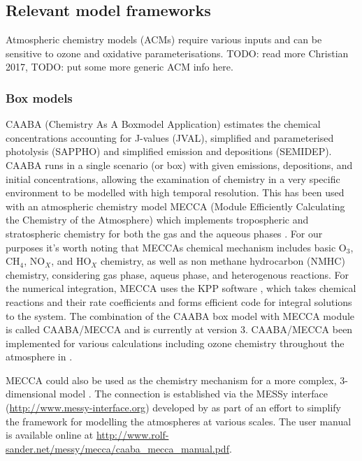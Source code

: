   \subsection{Relevant model frameworks}
  \label{LR:Models:frames}
    
    Atmospheric chemistry models (ACMs) require various inputs and can be sensitive to ozone and oxidative parameterisations. 
    TODO: read more Christian 2017,
    TODO: put some more generic ACM info here.
    
    \subsubsection{Box models} %
      
      CAABA (Chemistry As A Boxmodel Application) estimates the chemical concentrations accounting for J-values (JVAL), simplified and parameterised photolysis (SAPPHO) and simplified emission and depositions (SEMIDEP).
      CAABA runs in a single scenario (or box) with given emissions, depositions, and initial concentrations, allowing the examination of chemistry in a very specific environment to be modelled with high temporal resolution.
      This has been used with an atmospheric chemistry model MECCA (Module Efficiently Calculating the Chemistry of the Atmosphere) which implements tropospheric and stratospheric chemistry for both the gas and the aqueous phases \citep{Sander2005}.
      For our purposes it's worth noting that MECCAs chemical mechanism includes basic O$_3$, CH$_4$, NO$_X$, and HO$_X$ chemistry, as well as non methane hydrocarbon (NMHC) chemistry, considering gas phase, aqueus phase, and heterogenous reactions. \citep{Sander2005}
      For the numerical integration, MECCA uses the KPP software \citep{SanduSander2006}, which takes chemical reactions and their rate coefficients and forms efficient code for integral solutions to the system.
      The combination of the CAABA box model with MECCA module is called CAABA/MECCA and is currently at version 3.
      CAABA/MECCA been implemented for various calculations including ozone chemistry throughout the atmosphere in \cite{Zanis2014}.
  
      MECCA could also be used as the chemistry mechanism for a more complex, 3-dimensional model \citep[e.g.][]{Jockel2006}.
      The connection is established via the MESSy interface (\url{http://www.messy-interface.org}) developed by \cite{Jockel2005} as part of an effort to simplify the framework for modelling the atmospheres at various scales.
      The user manual is available online at \url{http://www.rolf-sander.net/messy/mecca/caaba_mecca_manual.pdf}.
  
